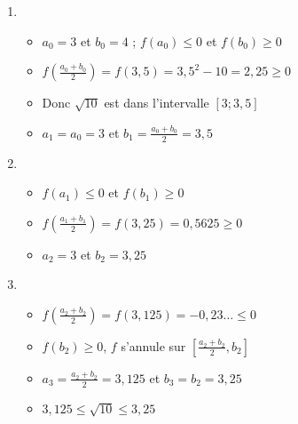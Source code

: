 \begin{frame}



  
\end{frame}

\begin{frame}
\begin{enumerate} \setlength{\itemsep}{7pt}
  \item 
  \begin{itemize}\setlength{\itemsep}{4pt}
    \item $a_0=3$ et $b_0=4$ ; $f(a_0)\le 0$ et $f(b_0) \ge 0$
    \item $f(\frac{a_0+b_0}{2})=f(3,5)=3,5^2-10 = 2,25 \ge0$
    \item Donc $\sqrt{10}$ est dans l'intervalle $[3 ; 3,5]$
    \item $a_1 = a_0 = 3$ et $b_1 = \frac{a_0+b_0}{2} = 3,5$    
  \end{itemize}

  \pause
  
  \item
  \begin{itemize}\setlength{\itemsep}{4pt}
    \item $f(a_1) \le 0$ et $f(b_1) \ge0$
    \item $f(\frac{a_1+b_1}{2})=f(3,25)=0,5625 \ge 0$
    \item $a_2=3$ et $b_2=3,25$   
  \end{itemize}  

  \pause
  
  \item
  \begin{itemize}\setlength{\itemsep}{4pt}
    \item $f(\frac{a_2+b_2}{2})=f(3,125)=-0,23\ldots \le 0$
    \item $f(b_2) \ge 0$, $f$ s'annule sur $[\frac{a_2+b_2}{2},b_2]$
    \item $a_3=\frac{a_2+b_2}{2}=3,125$ et $b_3=b_2=3,25$ 
    \item $3,125 \le \sqrt{10} \le 3,25$
  \end{itemize}  
\end{enumerate}

\end{frame}



